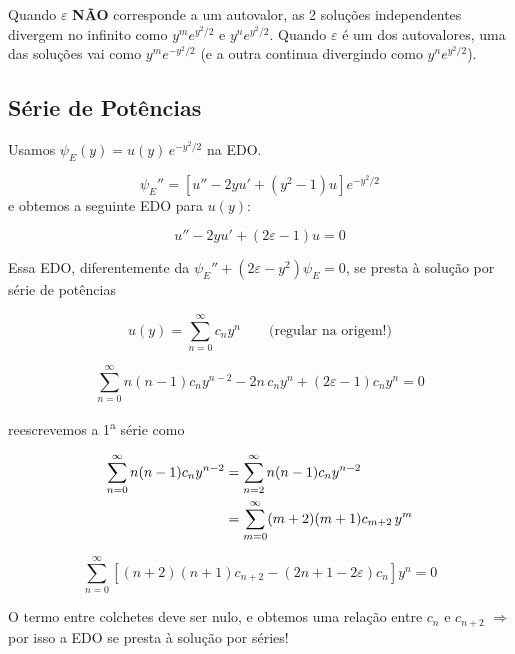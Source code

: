 Quando $\varepsilon$ \textbf{NÃO} corresponde a um autovalor, as 2 soluções independentes divergem no infinito como $y^m e^{y^2/2}$ e $y^n e^{y^2/2}$. Quando $\varepsilon$ é um dos autovalores, uma das soluções vai como $y^m e^{-y^2/2}$ (e a outra continua divergindo como $y^n e^{y^2/2}$).

\subsection*{Série de Potências}

Usamos $\psi_E(y) = u(y)\,e^{-y^2/2}$ na EDO.

\begin{equation}
    \psi_E'' = \left[u'' - 2yu' + (y^2-1)u\right]e^{-y^2/2}
\label{eq:aula16_psi_segunda_derivada}
\end{equation}
e obtemos a seguinte EDO para $u(y)$:

\begin{equation}
    \boxed{u'' - 2yu' + (2\varepsilon - 1)u = 0}
\label{eq:aula16_edo_u}
\end{equation}

Essa EDO, diferentemente da $\psi_E'' + (2\varepsilon - y^2)\psi_E = 0$, se presta à solução por série de potências

\begin{equation}
    u(y) = \sum_{n=0}^{\infty} c_n y^n \qquad \text{(regular na origem!)}
\label{eq:aula16_serie_potencias}
\end{equation}

\begin{equation}
    \sum_{n=0}^{\infty} n(n-1)c_n y^{n-2} - 2n\,c_n y^n + (2\varepsilon - 1)c_n y^n = 0
\label{eq:aula16_serie_substituida}
\end{equation}

reescrevemos a 1\textsuperscript{a} série como

\begin{align}
    \sum_{n=0}^{\infty} n(n-1)c_n y^{n-2} &= \sum_{n=2}^{\infty} n(n-1)c_n y^{n-2} \notag \\
    &= \sum_{m=0}^{\infty} (m+2)(m+1)c_{m+2}\, y^m
\label{eq:aula16_reescrita_serie}
\end{align}

\begin{equation}
    \sum_{n=0}^{\infty} \left[ (n+2)(n+1)c_{n+2} - (2n+1-2\varepsilon)c_n \right] y^n = 0
\label{eq:aula16_serie_colchetes}
\end{equation}

O termo entre colchetes deve ser nulo, e obtemos uma relação entre $c_n$ e $c_{n+2}$ $\Rightarrow$ por isso a EDO se presta à solução por séries!

